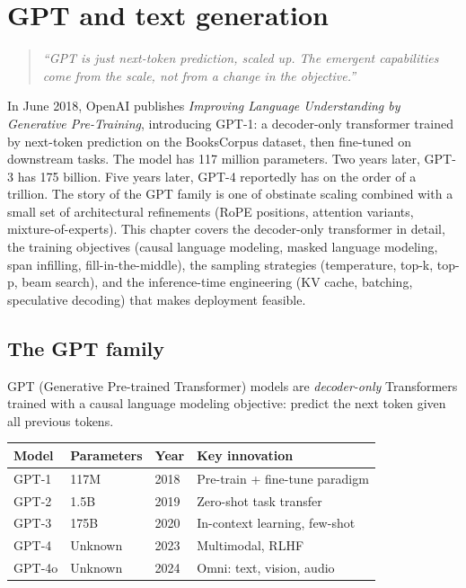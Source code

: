\chapter{GPT and text generation}
\label{ch:gpt-generation}

\begin{quote}
\emph{``GPT is just next-token prediction, scaled up. The emergent capabilities come from the scale, not from a change in the objective.''}
\end{quote}

In June 2018, OpenAI publishes \emph{Improving Language Understanding by Generative Pre-Training}, introducing GPT-1: a decoder-only transformer trained by next-token prediction on the BooksCorpus dataset, then fine-tuned on downstream tasks. The model has 117 million parameters. Two years later, GPT-3 has 175 billion. Five years later, GPT-4 reportedly has on the order of a trillion. The story of the GPT family is one of obstinate scaling combined with a small set of architectural refinements (RoPE positions, attention variants, mixture-of-experts). This chapter covers the decoder-only transformer in detail, the training objectives (causal language modeling, masked language modeling, span infilling, fill-in-the-middle), the sampling strategies (temperature, top-k, top-p, beam search), and the inference-time engineering (KV cache, batching, speculative decoding) that makes deployment feasible.

\section{The GPT family}

GPT (Generative Pre-trained Transformer) models are \emph{decoder-only} Transformers trained with a causal language modeling objective: predict the next token given all previous tokens.

\begin{longtable}{p{2.5cm}p{2.5cm}p{2.5cm}p{4.5cm}}
\toprule
\textbf{Model} & \textbf{Parameters} & \textbf{Year} & \textbf{Key innovation} \\
\midrule
GPT-1 & 117M & 2018 & Pre-train + fine-tune paradigm \\
GPT-2 & 1.5B & 2019 & Zero-shot task transfer \\
GPT-3 & 175B & 2020 & In-context learning, few-shot \\
GPT-4 & Unknown & 2023 & Multimodal, RLHF \\
GPT-4o & Unknown & 2024 & Omni: text, vision, audio \\
\bottomrule
\end{longtable}

